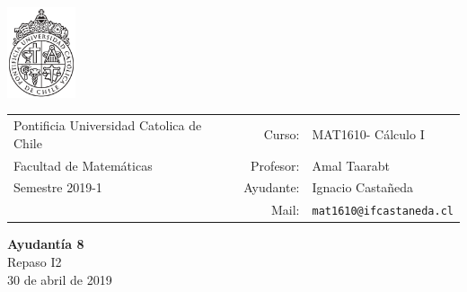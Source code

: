 \documentclass[12pt]{article}
\makeatletter
\newcommand{\ayudantia}{{\sc Ayudantía 8}}
\newcommand{\tituloayu}{Repaso I2}
\newcommand{\fecha}{30 de abril de 2019}
\newcommand{\sigla}{MAT1610}
\newcommand{\nombre}{Cálculo I}
\newcommand{\profesor}{Amal Taarabt}
\newcommand{\ano}{2019}
\newcommand{\semestre}{1}
\newcommand{\mail}{mat1610@ifcastaneda.cl}
\makeatother
\begin{document}
\thispagestyle{empty}

\begin{minipage}{2cm}
	\includegraphics[width=2cm]{../../../../img/logo.pdf}
	\vspace{0.5cm}
\end{minipage}
\begin{minipage}{\linewidth}
	\begin{tabular}{lrl}
		{\scriptsize\sc Pontificia Universidad Catolica de Chile} & \hspace*{0.7in}Curso: &
		\sigla  - \nombre\\
		{\sc Facultad de Matemáticas}&
		Profesor: & \profesor \\
		{\sc Semestre \ano-\semestre} & Ayudante: & {Ignacio Castañeda}\\
		& {Mail:} & \texttt{\mail}
	\end{tabular}
\end{minipage}

\vspace{-10mm}
\begin{center}
	{\LARGE\bf \ayudantia}\\
	\vspace{0.1cm}
	{\tituloayu}\\
	\vspace{0.1cm}
	\fecha\\
	\vspace{0.4cm}
\end{center}
\end{document}
